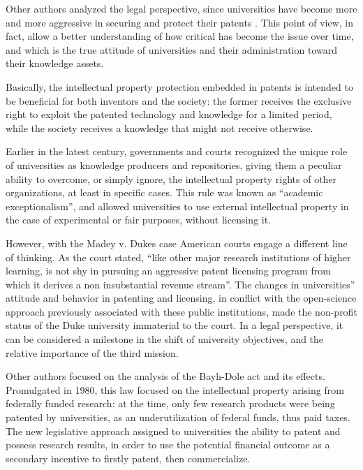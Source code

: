 Other authors analyzed the legal perspective, since universities have become more and more aggressive in securing and protect their patents \citep{Wysocki2004}. This point of view, in fact, allow a better understanding of how critical has become the issue over time, and which is the true attitude of universities and their administration toward their knowledge assets.

Basically, the intellectual property protection embedded in patents is intended to be beneficial for both inventors and the society: the former receives the exclusive right to exploit the patented technology and knowledge for a limited period, while the society receives a knowledge that might not receive otherwise. 

Earlier in the latest century, governments and courts recognized the unique role of universities as knowledge producers and repositories, giving them a peculiar ability to overcome, or simply ignore, the intellectual property rights of other organizations, at least in specific cases. This rule was known as \enquote{academic exceptionalism}, and allowed universities to use external intellectual property in the case of experimental or fair purposes, without licensing it.

However, with the Madey v. Dukes case \citep{Hayter2016} American courts engage a different line of thinking. As the court stated, \enquote{like other major research institutions of higher learning, is not shy in pursuing an aggressive patent licensing program from which it derives a non insubstantial revenue stream}. The changes in universities'' attitude and behavior in patenting and licensing, in conflict with the open-science approach previously associated with these public institutions, made the non-profit status of the Duke university immaterial to the court. In a legal perspective, it can be considered a milestone in the shift of university objectives, and the relative importance of the third mission.

Other authors focused on the analysis of the Bayh-Dole act and its effects. Promulgated in 1980, this law focused on the intellectual property arising from federally funded research: at the time, only few research products were being patented by universities, as an underutilization of federal funds, thus paid taxes. The new legislative approach assigned to universities the ability to patent and possess research results, in order to use the potential financial outcome as a secondary incentive to firstly patent, then commercialize. 

